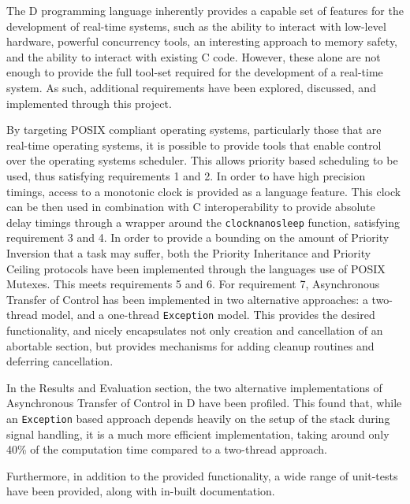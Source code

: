 

The D programming language inherently provides a capable set of features for the 
development of real-time systems, such as the ability to interact with low-level 
hardware, powerful concurrency tools, an interesting approach to memory 
safety, and the ability to interact with existing C code. 
However, these alone are not enough to provide the full tool-set required for
the development of a real-time system. 
As such, additional requirements have been explored, discussed, and implemented 
through this project. 
\par\bigskip\noindent
By targeting POSIX compliant operating systems, particularly those that are
real-time operating systems, it is possible to provide tools that enable control 
over the operating systems scheduler. 
This allows priority based scheduling to be used, thus satisfying requirements
1 and 2.
In order to have high precision timings, access to a monotonic clock is provided 
as a language feature. 
This clock can be then used in combination with C
interoperability to provide absolute delay timings through a wrapper around the
\texttt{clock\textunderscore{}nanosleep} function, satisfying requirement 3 and
4. 
In order to provide a bounding on the amount of Priority Inversion that a task
may suffer, both the Priority Inheritance and Priority Ceiling protocols have
been implemented through the languages use of POSIX Mutexes. This meets
requirements 5 and 6. 
For requirement 7, Asynchronous Transfer of Control has been implemented in two 
alternative approaches: a two-thread model, and a one-thread \texttt{Exception} model. 
This provides the desired functionality, and 
nicely encapsulates not only creation and cancellation of an
abortable section, but provides mechanisms for adding cleanup routines and deferring 
cancellation. 
\par\bigskip\noindent
In the Results and Evaluation section, the two alternative implementations of
Asynchronous Transfer of Control in D have been profiled. 
This found that, while an \texttt{Exception} based approach depends 
heavily on the setup of the stack during signal handling, it is a much more efficient
implementation, taking around only 40\% of the computation time compared to a
two-thread approach. 
\par\bigskip\noindent
Furthermore, in addition to the provided functionality, a wide range of unit-tests 
have been provided, along with in-built documentation. 
